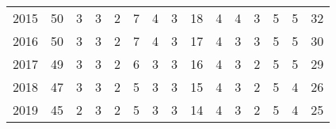 \begin{tabular}{lrrrrrrrrrrrrrr}
2015 &               50 &             3 &        3 &          2 &              7 &            4 &           3 &           18 &         4 &             4 &              3 &        5 &               5 &           32 \\
2016 &               50 &             3 &        3 &          2 &              7 &            4 &           3 &           17 &         4 &             3 &              3 &        5 &               5 &           30 \\
2017 &               49 &             3 &        3 &          2 &              6 &            3 &           3 &           16 &         4 &             3 &              2 &        5 &               5 &           29 \\
2018 &               47 &             3 &        3 &          2 &              5 &            3 &           3 &           15 &         4 &             3 &              2 &        5 &               4 &           26 \\
2019 &               45 &             2 &        3 &          2 &              5 &            3 &           3 &           14 &         4 &             3 &              2 &        5 &               4 &           25 \\
\bottomrule
\end{tabular}
